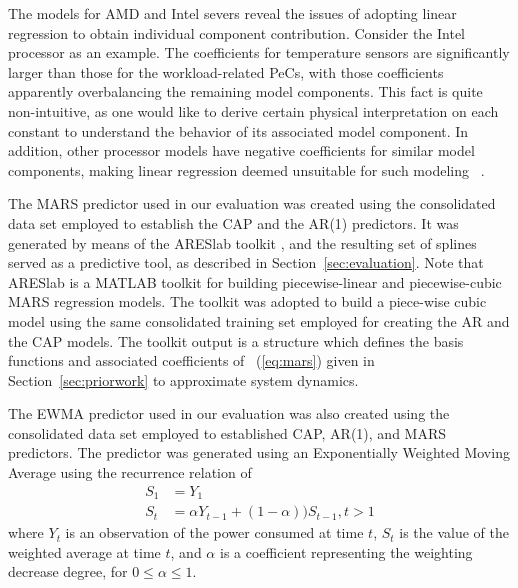 The models for AMD and Intel severs reveal the issues of adopting linear
regression to obtain individual component contribution.  Consider the
Intel processor as an example.  The coefficients for temperature sensors
are significantly larger than those for the workload-related PeCs, with
those coefficients apparently overbalancing the remaining model
components.  This fact is quite non-intuitive, as one would like to
derive certain physical interpretation on each constant to understand
the behavior of its associated model component.  In addition, other
processor models have negative coefficients for similar model
components, making linear regression deemed unsuitable for such modeling
~\cite{Bertran2010,McCullough2011}.
\begin{comment}
One concern here is that may also be true for the components of the
chaotic times series.  It may be best to point out how we're reasoning
about the totality rather than the components of the system.
\end{comment}

The MARS predictor used in our evaluation was created using the
consolidated data set employed to establish the CAP and the AR(1)
predictors.  It was generated by means of the ARESlab toolkit
\cite{Jekabsons2010}, and the resulting set of splines served as a
predictive tool, as described in Section~\ref{sec:evaluation}.  Note
that ARESlab is a MATLAB toolkit for building piecewise-linear and
piecewise-cubic MARS regression models.  The toolkit was adopted to
build a piece-wise cubic model using the same consolidated training set
employed for creating the AR and the CAP models.  The toolkit output is
a structure which defines the basis functions and associated
coefficients of \equationname~(\ref{eq:mars}) given in
Section~\ref{sec:priorwork} to approximate system dynamics.

The EWMA predictor used in our evaluation was also created using the
consolidated data set employed to established CAP, AR(1), and MARS
predictors.  The predictor was generated using an Exponentially Weighted
Moving Average using the recurrence relation of
\begin{align}
  \label{eq:1}
  S_{1}&=Y_{1}\nonumber\\
  S_{t}&=\alpha Y_{t-1}+(1-\alpha))S_{t-1}, t>1\nonumber
\end{align}
where $Y_{t}$ is an observation of the power consumed at time $t$,
$S_{t}$ is the value of the weighted average at time $t$, and $\alpha$
is a coefficient representing the weighting decrease degree, for
$0\leq \alpha \leq1$.
